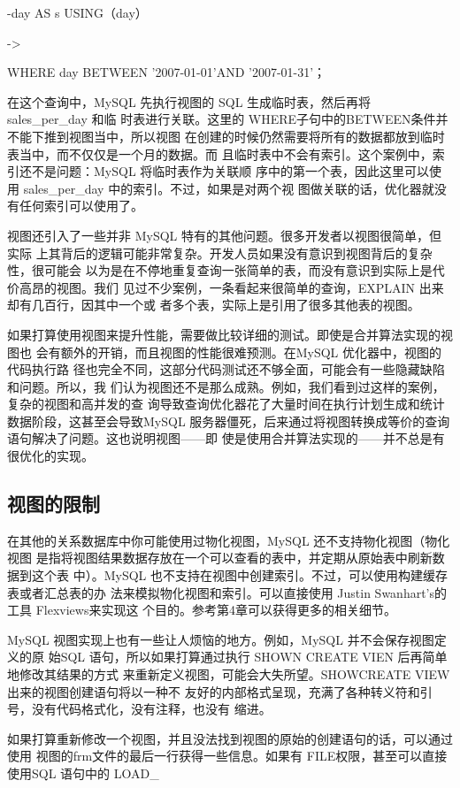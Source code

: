 -day AS s USING（day）

->

WHERE day BETWEEN '2007-01-01'AND '2007-01-31'；

在这个查询中，MySQL 先执行视图的 SQL 生成临时表，然后再将 sales\_per\_day 和临
时表进行关联。这里的 WHERE子句中的BETWEEN条件并不能下推到视图当中，所以视图
在创建的时候仍然需要将所有的数据都放到临时表当中，而不仅仅是一个月的数据。而
且临时表中不会有索引。这个案例中，索引还不是问题：MySQL 将临时表作为关联顺
序中的第一个表，因此这里可以使用 sales\_per\_day 中的索引。不过，如果是对两个视
图做关联的话，优化器就没有任何索引可以使用了。

视图还引入了一些并非 MySQL 特有的其他问题。很多开发者以视图很简单，但实际
上其背后的逻辑可能非常复杂。开发人员如果没有意识到视图背后的复杂性，很可能会
以为是在不停地重复查询一张简单的表，而没有意识到实际上是代价高昂的视图。我们
见过不少案例，一条看起来很简单的查询，EXPLAIN 出来却有几百行，因其中一个或
者多个表，实际上是引用了很多其他表的视图。

如果打算使用视图来提升性能，需要做比较详细的测试。即使是合并算法实现的视图也
会有额外的开销，而且视图的性能很难预测。在MySQL 优化器中，视图的代码执行路
径也完全不同，这部分代码测试还不够全面，可能会有一些隐藏缺陷和问题。所以，我
们认为视图还不是那么成熟。例如，我们看到过这样的案例，复杂的视图和高并发的查
询导致查询优化器花了大量时间在执行计划生成和统计数据阶段，这甚至会导致MySQL
服务器僵死，后来通过将视图转换成等价的查询语句解决了问题。这也说明视图——即
使是使用合并算法实现的——并不总是有很优化的实现。

\subsection{视图的限制}
在其他的关系数据库中你可能使用过物化视图，MySQL 还不支持物化视图（物化视图
是指将视图结果数据存放在一个可以查看的表中，并定期从原始表中刷新数据到这个表
中）。MySQL 也不支持在视图中创建索引。不过，可以使用构建缓存表或者汇总表的办
法来模拟物化视图和索引。可以直接使用 Justin Swanhart's的工具 Flexviews来实现这
个目的。参考第4章可以获得更多的相关细节。

MySQL 视图实现上也有一些让人烦恼的地方。例如，MySQL 并不会保存视图定义的原
始SQL 语句，所以如果打算通过执行 SHOWN CREATE VIEN 后再简单地修改其结果的方式
来重新定义视图，可能会大失所望。SHOWCREATE VIEW 出来的视图创建语句将以一种不
友好的内部格式呈现，充满了各种转义符和引号，没有代码格式化，没有注释，也没有
缩进。

如果打算重新修改一个视图，并且没法找到视图的原始的创建语句的话，可以通过使用
视图的frm文件的最后一行获得一些信息。如果有 FILE权限，甚至可以直接使用SQL
语句中的 LOAD\_


